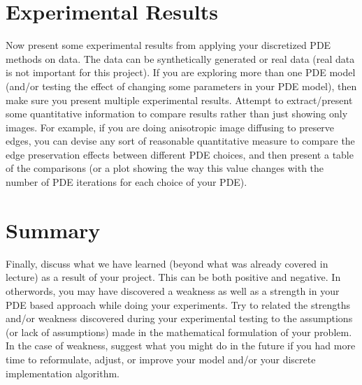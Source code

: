 \documentclass{article}
\begin{document}
  \section{Experimental Results}
  Now present some experimental results from applying your discretized
  PDE methods on data. The data can be synthetically generated or real data
  (real data is not important for this project). If you are exploring more
  than one PDE model (and/or testing the effect of changing some parameters in
  your PDE model), then make sure you present multiple experimental results.
  Attempt to extract/present some quantitative information to compare results
  rather than just showing only images. For example, if you are doing anisotropic
  image diffusing to preserve edges, you can devise any sort of reasonable
  quantitative measure to compare the edge preservation effects between
  different PDE choices, and then present a table of the comparisons (or a plot
  showing the way this value changes with the number of PDE iterations for
  each choice of your PDE).

  \section{Summary}
  Finally, discuss what we have learned (beyond what was already covered in
  lecture) as a result of your project. This can be both positive and negative.
  In otherwords, you may have discovered a weakness as well as a strength in
  your PDE based approach while doing your experiments. Try to related the
  strengths and/or weakness discovered during your experimental testing to
  the assumptions (or lack of assumptions) made in the mathematical formulation
  of your problem. In the case of weakness, suggest what you might do in
  the future if you had more time to reformulate, adjust, or improve your
  model and/or your discrete implementation algorithm.
\end{document}
